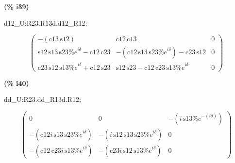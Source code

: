 \documentclass[fleqn]{article}
\begin{document}
\noindent
\begin{minipage}[t]{4.000000em}\color{red}\bfseries
(\% i39)	
\end{minipage}
\begin{minipage}[t]{\textwidth}\color{blue}
d12\_U:R23.R13d.d12\_R12;
\end{minipage}
\[\displaystyle \tag{d12\_ U} 
\begin{pmatrix}\mathop{-}\left( \ensuremath{\mathrm{c13}}\, \ensuremath{\mathrm{s12}}\right)  & \ensuremath{\mathrm{c12}}\, \ensuremath{\mathrm{c13}} & 0\\
\ensuremath{\mathrm{s12}}\, \ensuremath{\mathrm{s13}}\, \ensuremath{\mathrm{s23}} {{\% e}^{i \delta }}\mathop{-}\ensuremath{\mathrm{c12}}\, \ensuremath{\mathrm{c23}} & \mathop{-}\left( \ensuremath{\mathrm{c12}}\, \ensuremath{\mathrm{s13}}\, \ensuremath{\mathrm{s23}} {{\% e}^{i \delta }}\right) \mathop{-}\ensuremath{\mathrm{c23}}\, \ensuremath{\mathrm{s12}} & 0\\
\ensuremath{\mathrm{c23}}\, \ensuremath{\mathrm{s12}}\, \ensuremath{\mathrm{s13}} {{\% e}^{i \delta }}\mathop{+}\ensuremath{\mathrm{c12}}\, \ensuremath{\mathrm{s23}} & \ensuremath{\mathrm{s12}}\, \ensuremath{\mathrm{s23}}\mathop{-}\ensuremath{\mathrm{c12}}\, \ensuremath{\mathrm{c23}}\, \ensuremath{\mathrm{s13}} {{\% e}^{i \delta }} & 0\end{pmatrix}\mbox{}
\]


\noindent
\begin{minipage}[t]{4.000000em}\color{red}\bfseries
(\% i40)	
\end{minipage}
\begin{minipage}[t]{\textwidth}\color{blue}
dd\_U:R23.dd\_R13d.R12;
\end{minipage}
\[\displaystyle \tag{dd\_ U} 
\begin{pmatrix}0 & 0 & \mathop{-}\left( i\, \ensuremath{\mathrm{s13}} {{\% e}^{-\left( i \delta \right) }}\right) \\
\mathop{-}\left( \ensuremath{\mathrm{c12}} i\, \ensuremath{\mathrm{s13}}\, \ensuremath{\mathrm{s23}} {{\% e}^{i \delta }}\right)  & \mathop{-}\left( i\, \ensuremath{\mathrm{s12}}\, \ensuremath{\mathrm{s13}}\, \ensuremath{\mathrm{s23}} {{\% e}^{i \delta }}\right)  & 0\\
\mathop{-}\left( \ensuremath{\mathrm{c12}}\, \ensuremath{\mathrm{c23}} i\, \ensuremath{\mathrm{s13}} {{\% e}^{i \delta }}\right)  & \mathop{-}\left( \ensuremath{\mathrm{c23}} i\, \ensuremath{\mathrm{s12}}\, \ensuremath{\mathrm{s13}} {{\% e}^{i \delta }}\right)  & 0\end{pmatrix}\mbox{}
\]
\end{document}
